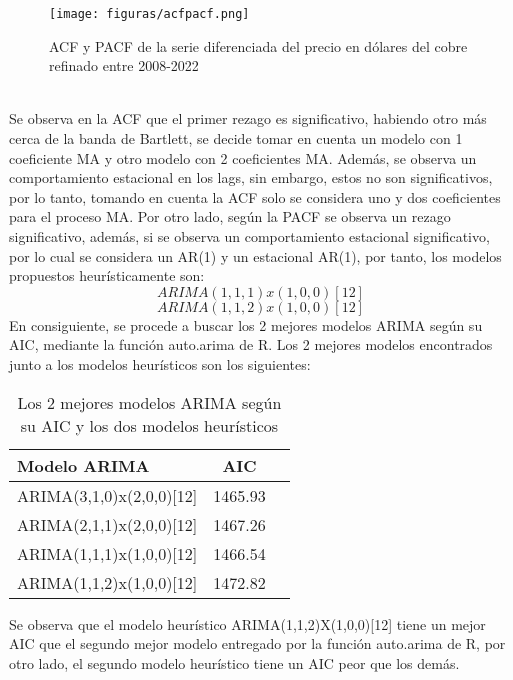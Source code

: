 \documentclass{report}
\begin{document}
\begin{figure}[htp]
        \centering
    	\texttt{[image: figuras/acfpacf.png]}
    	\caption{ACF y PACF de la serie diferenciada del precio en dólares del cobre refinado entre 2008-2022}
    	\label{fig: Figura1}
    \end{figure}\\
Se observa en la ACF que el primer rezago es significativo, habiendo otro más cerca de la banda de Bartlett, se decide tomar en cuenta un modelo con 1 coeficiente MA y otro modelo con 2 coeficientes MA. Además, se observa un comportamiento estacional en los lags, sin embargo, estos no son significativos, por lo tanto, tomando en cuenta la ACF solo se considera uno y dos coeficientes para el proceso MA. Por otro lado, según la PACF se observa un rezago significativo, además, si se observa un comportamiento estacional significativo, por lo cual se considera un AR(1) y un estacional AR(1), por tanto, los modelos propuestos heurísticamente son:\\
$$ARIMA(1,1,1)x(1,0,0)[12]$$
$$ARIMA(1,1,2)x(1,0,0)[12]$$
En consiguiente, se procede a buscar los 2 mejores modelos ARIMA según su AIC, mediante la función auto.arima de R. Los 2 mejores modelos encontrados junto a los modelos heurísticos son los siguientes:\\
\vspace{3cm}

\begin{table}[h!]
  \begin{center}
    \label{tab:table1}
    \begin{tabular}{|l|c|r|} 
      \hline
      \textbf{Modelo ARIMA} & \textbf{AIC}\\
      \hline
      ARIMA(3,1,0)x(2,0,0)[12] & 1465.93  \\
      \hline 
      ARIMA(2,1,1)x(2,0,0)[12] & 1467.26 \\
      \hline
      ARIMA(1,1,1)x(1,0,0)[12] & 1466.54\\
      \hline
      ARIMA(1,1,2)x(1,0,0)[12] & 1472.82\\
      \hline
    \end{tabular}
  \end{center}
  \caption{Los 2 mejores modelos ARIMA según su AIC y los dos modelos heurísticos}
\end{table}
Se observa que el modelo heurístico ARIMA(1,1,2)X(1,0,0)[12] tiene un mejor AIC que el segundo mejor modelo entregado por la función auto.arima de R, por otro lado, el segundo modelo heurístico tiene un AIC peor que los demás.\\
\end{document}
